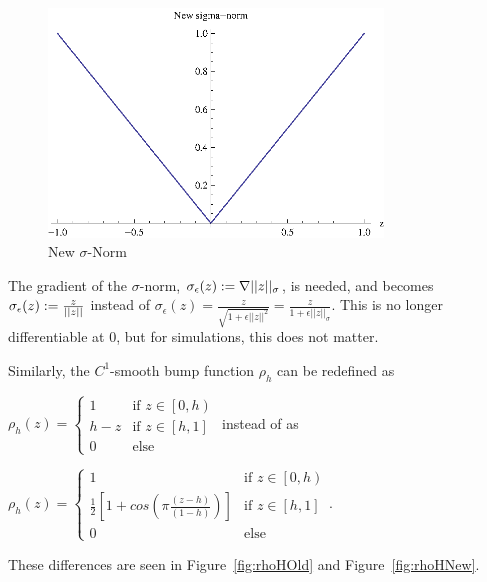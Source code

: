 \documentclass[10pt, conference, compsocconf]{IEEEtran}
\begin{document}
\begin{figure}[!b]
  \begin{center}
    \includegraphics[width=3.5in]{sigmaNormNew}
  \end{center}

  \caption{\small New $\sigma$-Norm}
  \label{fig:newSigmaNorm}
\end{figure}

%
The gradient of the $\sigma$-norm, $\sigma_{\epsilon}(z) := \nabla \lvert\lvert z\rvert\rvert_{\sigma}$, is needed, and becomes $\sigma_{\epsilon}(z) := \frac{z}{\lvert\lvert z\rvert\rvert}$ instead of $\sigma_{\epsilon}(z) = \frac{z}{\sqrt{1 + \epsilon||z||^2}} = \frac{z}{1 + \epsilon||z||_{\sigma}}$.
%
This is no longer differentiable at $0$, but for simulations, this does not matter.

Similarly, the $C^1$-smooth bump function $\rho_{h}$ can be redefined as 

$\rho_{h}\left(z\right) = \left\{ \begin{array}{ll} 
1 & \textrm{if } z \in \left[0, h\right) \\
h - z & \textrm{if } z \in \left[h, 1\right] \\
0 & \textrm{else} \end{array} \right. $
instead of as 

$\rho_{h}\left(z\right) = \left\{ \begin{array}{ll} 
1 & \textrm{if } z \in \left[0, h\right) \\
\frac{1}{2}\left[1 + cos\left(\pi\frac{\left(z - h\right)}{\left(1 - h\right)}\right)\right] & \textrm{if } z \in \left[h, 1\right] \\
0 & \textrm{else} \end{array} \right. $.

These differences are seen in Figure~\ref{fig:rhoHOld} and Figure~\ref{fig:rhoHNew}.
\end{document}
